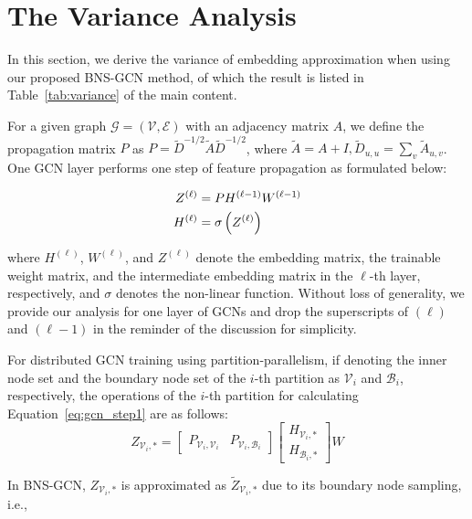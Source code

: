 \documentclass{article}
\begin{document}



\appendix


\onecolumn


\section{The Variance Analysis}
\label{sec:var_proof}

In this section, we derive the variance of embedding approximation when using our proposed BNS-GCN method, of which the result is listed in Table~\ref{tab:variance} of the main content. 

For a given graph $\mathcal{G}=(\mathcal{V},\mathcal{E})$ with an adjacency matrix $A$, we define the propagation matrix $P$ as $P=\tilde{D}^{-1/2}\tilde{A}\tilde{D}^{-1/2}$, where $\tilde{A}=A+I,\tilde{D}_{u,u}=\sum_v\tilde{A}_{u,v}$. One GCN layer performs one step of feature propagation \citep{kipf2016semi} as formulated below: 


\begin{align}
Z^{(\ell)}&=PH^{(\ell-1)}W^{(\ell-1)} \label{eq:gcn_step1}\\
H^{(\ell)}&=\sigma\left(Z^{(\ell)}\right)\notag
\end{align}

where $H^{(\ell)}$, $W^{(\ell)}$, and $Z^{(\ell)}$ denote the embedding matrix, the trainable weight matrix, and the intermediate embedding matrix in the $\ell$-th layer, respectively, and $\sigma$ denotes the non-linear function. 
Without loss of generality, we provide our analysis for one layer of GCNs and drop the superscripts of $(\ell)$ and $(\ell-1)$ in the reminder of the discussion for simplicity.


For distributed GCN training using partition-parallelism, if denoting the inner node set and the boundary node set of the $i$-th partition as $\mathcal{V}_i$ and $\mathcal{B}_i$, respectively, the operations of the $i$-th partition
for calculating Equation~\ref{eq:gcn_step1} are as follows:
$$Z_{\mathcal{V}_i,*}=
\begin{bmatrix}
P_{\mathcal{V}_i,\mathcal{V}_i} & P_{\mathcal{V}_i,\mathcal{B}_i}
\end{bmatrix}
\begin{bmatrix}
H_{\mathcal{V}_i,*} \\
H_{\mathcal{B}_i,*}
\end{bmatrix}W$$


In BNS-GCN, $Z_{\mathcal{V}_i,*}$ is approximated as $\tilde{Z}_{\mathcal{V}_i,*}$ due to its boundary node sampling, i.e.,  
\end{document}
